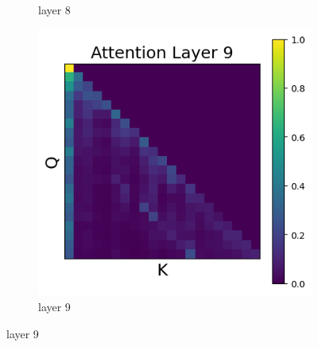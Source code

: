 \documentclass[11pt]{article}
\begin{document}
\begin{figure}[t]
\begin{subfigure}[t]{0.24\textwidth}
    \caption{layer 8}
  \end{subfigure}\hfill
      \begin{subfigure}[t]{0.24\textwidth}
    \centering
    \includegraphics[width=1.4\columnwidth]{figures/intervention1/layer_9.png}
    \caption{layer 9}
  \end{subfigure}\hfill
    

\end{figure}
\end{document}
